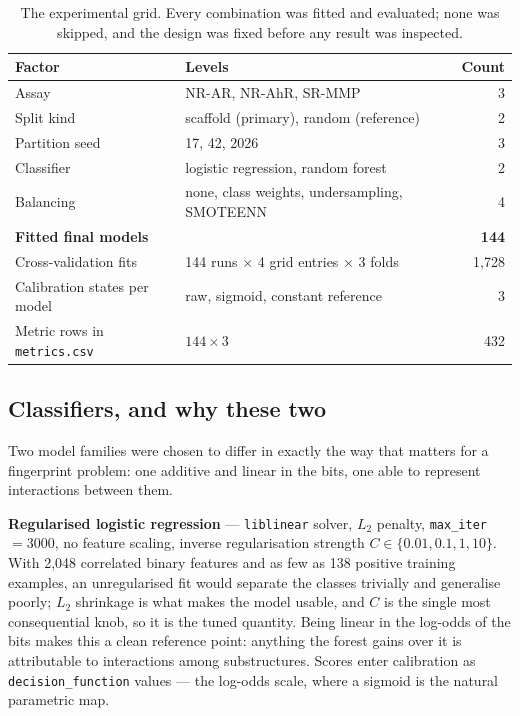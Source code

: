 \documentclass[10pt,letterpaper]{article}
\begin{document}
\begin{table}[!htbp]
\centering
\small
\caption{The experimental grid. Every combination was fitted and evaluated; none was skipped, and
the design was fixed before any result was inspected.}
\label{tab:grid}
\begin{tabular}{@{}llr@{}}
\toprule
Factor & Levels & Count \\
\midrule
Assay & NR-AR, NR-AhR, SR-MMP & 3 \\
Split kind & scaffold (primary), random (reference) & 2 \\
Partition seed & 17, 42, 2026 & 3 \\
Classifier & logistic regression, random forest & 2 \\
Balancing & none, class weights, undersampling, SMOTEENN & 4 \\
\midrule
\textbf{Fitted final models} & & \textbf{144} \\
Cross-validation fits & 144 runs $\times$ 4 grid entries $\times$ 3 folds & 1{,}728 \\
Calibration states per model & raw, sigmoid, constant reference & 3 \\
Metric rows in \texttt{metrics.csv} & $144\times3$ & 432 \\
\bottomrule
\end{tabular}
\end{table}

\subsection{Classifiers, and why these two}

Two model families were chosen to differ in exactly the way that matters for a fingerprint problem:
one additive and linear in the bits, one able to represent interactions between them.

\textbf{Regularised logistic regression} --- \texttt{liblinear} solver, $L_2$ penalty,
\texttt{max\_iter}~$=3000$, no feature scaling, inverse regularisation strength
$C \in \{0.01, 0.1, 1, 10\}$. With 2{,}048 correlated binary features and as few as 138 positive
training examples, an unregularised fit would separate the classes trivially and generalise poorly;
$L_2$ shrinkage is what makes the model usable, and $C$ is the single most consequential knob, so it
is the tuned quantity. Being linear in the log-odds of the bits makes this a clean reference point:
anything the forest gains over it is attributable to interactions among substructures. Scores enter
calibration as \texttt{decision\_function} values --- the log-odds scale, where a sigmoid is the
natural parametric map.
\end{document}
